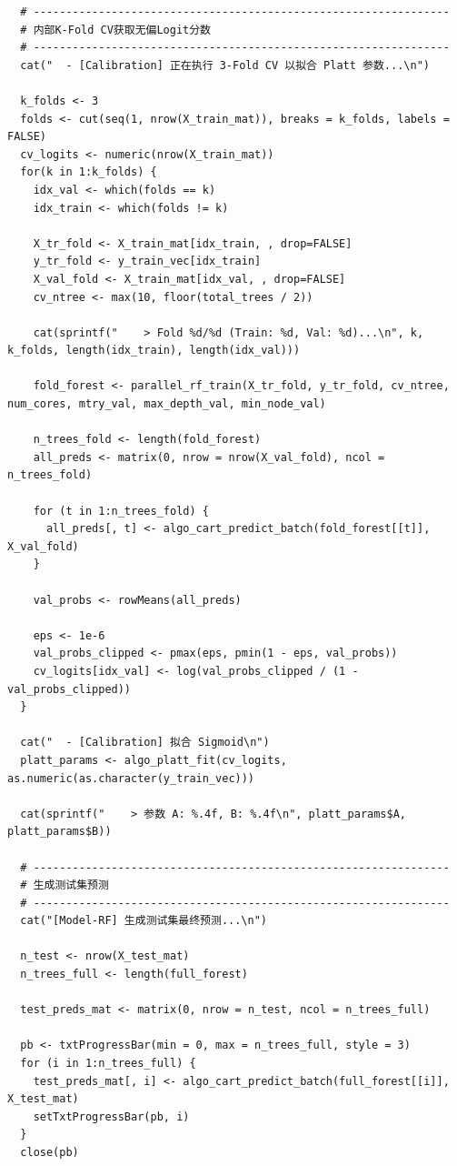 \documentclass[11pt, a4paper]{article}
\begin{document}
\begin{verbatim}
  # ----------------------------------------------------------------
  # 内部K-Fold CV获取无偏Logit分数
  # ----------------------------------------------------------------
  cat("  - [Calibration] 正在执行 3-Fold CV 以拟合 Platt 参数...\n")
  
  k_folds <- 3
  folds <- cut(seq(1, nrow(X_train_mat)), breaks = k_folds, labels = FALSE)
  cv_logits <- numeric(nrow(X_train_mat))
  for(k in 1:k_folds) {
    idx_val <- which(folds == k)
    idx_train <- which(folds != k)
    
    X_tr_fold <- X_train_mat[idx_train, , drop=FALSE]
    y_tr_fold <- y_train_vec[idx_train]
    X_val_fold <- X_train_mat[idx_val, , drop=FALSE]
    cv_ntree <- max(10, floor(total_trees / 2)) 
    
    cat(sprintf("    > Fold %d/%d (Train: %d, Val: %d)...\n", k, k_folds, length(idx_train), length(idx_val)))
    
    fold_forest <- parallel_rf_train(X_tr_fold, y_tr_fold, cv_ntree, num_cores, mtry_val, max_depth_val, min_node_val)
    
    n_trees_fold <- length(fold_forest)
    all_preds <- matrix(0, nrow = nrow(X_val_fold), ncol = n_trees_fold)
    
    for (t in 1:n_trees_fold) {
      all_preds[, t] <- algo_cart_predict_batch(fold_forest[[t]], X_val_fold)
    }

    val_probs <- rowMeans(all_preds)
    
    eps <- 1e-6
    val_probs_clipped <- pmax(eps, pmin(1 - eps, val_probs))
    cv_logits[idx_val] <- log(val_probs_clipped / (1 - val_probs_clipped))
  }
  
  cat("  - [Calibration] 拟合 Sigmoid\n")
  platt_params <- algo_platt_fit(cv_logits, as.numeric(as.character(y_train_vec)))
  
  cat(sprintf("    > 参数 A: %.4f, B: %.4f\n", platt_params$A, platt_params$B))
  
  # ----------------------------------------------------------------
  # 生成测试集预测
  # ----------------------------------------------------------------
  cat("[Model-RF] 生成测试集最终预测...\n")
  
  n_test <- nrow(X_test_mat)
  n_trees_full <- length(full_forest)
  
  test_preds_mat <- matrix(0, nrow = n_test, ncol = n_trees_full)
  
  pb <- txtProgressBar(min = 0, max = n_trees_full, style = 3)
  for (i in 1:n_trees_full) {
    test_preds_mat[, i] <- algo_cart_predict_batch(full_forest[[i]], X_test_mat)
    setTxtProgressBar(pb, i)
  }
  close(pb)
  

\end{verbatim}
\end{document}
